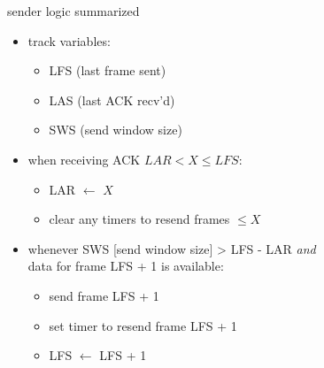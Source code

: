 \begin{frame}{sender logic summarized}
\begin{itemize}
\item track variables:
    \begin{itemize}
    \item LFS (last frame sent)
    \item LAS (last ACK recv'd)
    \item SWS (send window size)
    \end{itemize}
\item when receiving ACK $LAR < X \le LFS$:
    \begin{itemize}
    \item LAR $\leftarrow$ $X$
    \item clear any timers to resend frames $\le X$
    \end{itemize}
\item whenever SWS [send window size] > LFS - LAR \textit{and} \\
    data for frame LFS + 1 is available:
    \begin{itemize}
    \item send frame LFS + 1
    \item set timer to resend frame LFS + 1
    \item LFS $\leftarrow$ LFS + 1
    \end{itemize}
\end{itemize}
\end{frame}
